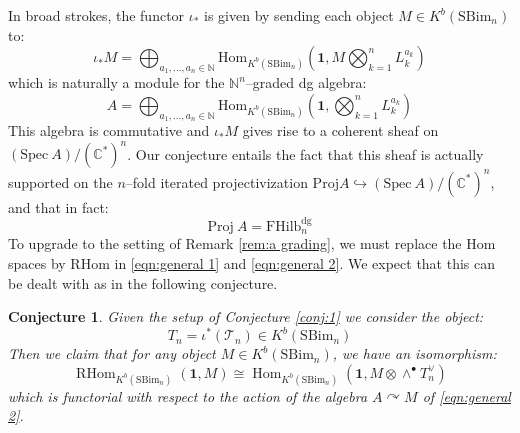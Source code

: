 \documentclass[12pt]{amsart}
\numberwithin{equation}{section}
\newtheorem{conjecture}[theorem]{Conjecture}
\theoremstyle{definition}
\theoremstyle{remark}
\DeclareMathOperator{\Tr}{Tr}
\DeclareMathOperator{\Hom}{Hom}
\DeclareMathOperator{\RHom}{{RHom}}
\newcommand{\CC}{\mathbb{C}}
\newcommand{\NN}{\mathbb{N}}
\newcommand{\CT}{\mathcal{T}}
\newcommand{\FT}{\mathbf{FT}}
\renewcommand{\1}{\mathbf{1}}
\newcommand{\FH}{\mathrm{FHilb}}
\newcommand{\spec}{\mathrm{Spec}}
\newcommand{\proj}{\mathrm{Proj}}
\newcommand{\SBim}{\mathrm{SBim}}
\newcommand{\dg}{\text{dg}}%
\begin{document}

In broad strokes, the functor $\iota_*$ is given by sending each object $M \in K^b(\SBim_n)$ to:
\begin{equation}
\label{eqn:general 1}
\iota_* M = \bigoplus_{a_1,...,a_n \in \NN} \text{Hom}_{K^b(\SBim_n)} \left(\1, M \bigotimes_{k=1}^n L_k^{a_k} \right) 
\end{equation}
which is naturally a module for the $\NN^n$--graded dg algebra:
\begin{equation}
\label{eqn:general 2}
A = \bigoplus_{a_1,...,a_n \in \NN} \text{Hom}_{K^b(\SBim_n)} \left(\1, \bigotimes_{k=1}^n L_k^{a_k} \right)
\end{equation}
This algebra is commutative %
and %
$\iota_*M$ gives rise to a coherent sheaf on $(\spec \ A)/(\CC^*)^n$. Our conjecture entails the fact that this sheaf is actually supported on the $n$--fold iterated projectivization $\proj A \hookrightarrow (\spec \ A)/(\CC^*)^n$, and that in fact:
\begin{equation}
\label{eqn:general 3}
\proj \ A = \FH_n^\dg
\end{equation}
To upgrade to the setting of Remark \ref{rem:a grading}, we must replace the Hom spaces by RHom in \eqref{eqn:general 1} and \eqref{eqn:general 2}. We expect that this can be dealt with as in the following conjecture.

\begin{conjecture}
\label{conj:a grading}
Given the setup of Conjecture \ref{conj:1} we consider the object:
$$
T_n  = \iota^*(\CT_n) \in K^b(\SBim_n)
$$
Then we claim that for any object $M \in K^b(\SBim_n)$, we have an isomorphism:
\begin{equation}
\label{eqn:rhom vs hom}
\RHom_{K^b(\SBim_n)}(\1, M) \cong \Hom_{K^b(\SBim_n)}\left(\1, M \otimes \wedge^\bullet T^\vee_n \right)
\end{equation}
which is functorial with respect to the action of the algebra $A \curvearrowright M$ of \eqref{eqn:general 2}.

\end{conjecture}
\end{document}
